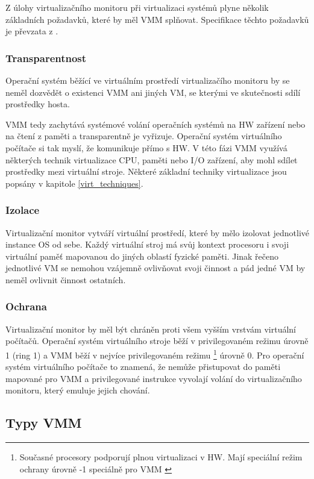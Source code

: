 Z úlohy virtualizačního monitoru při virtualizaci systémů plyne několik základních požadavků, které by měl VMM splňovat. Specifikace těchto požadavků je převzata z \cite{virt2}.

\subsubsection*{Transparentnost}

Operační systém běžící ve virtuálním prostředí virtualizačího monitoru by se neměl dozvědět o existenci VMM ani jiných VM, se kterými ve skutečnosti sdílí prostředky hosta.

VMM tedy zachytává systémové volání operačních systémů na HW zařízení nebo na čtení z paměti a transparentně je vyřizuje. Operační systém virtuálního počítače si tak myslí, že komunikuje přímo s HW. V této fázi VMM využívá 
některých technik virtualizace CPU, paměti nebo I/O zařízení, aby mohl sdílet prostředky mezi virtuální stroje. Některé základní techniky virtualizace jsou popsány v kapitole \ref{virt_techniques}.

\subsubsection*{Izolace}

Virtualizační monitor vytváří virtuální prostředí, které by mělo izolovat jednotlivé instance OS od sebe. Každý virtuální stroj má svůj kontext procesoru i svoji virtuální paměť mapovanou do jiných oblastí fyzické paměti.
Jinak řečeno jednotlivé VM se nemohou vzájemně ovlivňovat svoji činnost a pád jedné VM by neměl ovlivnit činnost ostatních.


\subsubsection*{Ochrana}

Virtualizační monitor by měl být chráněn proti všem vyšším vrstvám virtuální počítačů. Operační systém virtuálního stroje běží v privilegovaném režimu úrovně 1 (ring 1) a VMM běží v nejvíce privilegovaném režimu \footnote[1]{Současné procesory podporují plnou virtualizaci v HW. Mají speciální 
režim ochrany úrovně -1 speciálně pro VMM \cite{virt2}} úrovně 0. Pro operační systém virtuálního počítače to znamená, že nemůže přistupovat do paměti mapované pro VMM a privilegované instrukce vyvolají volání do virtualizačního monitoru, který emuluje jejich chování. 


\subsection{Typy VMM}

